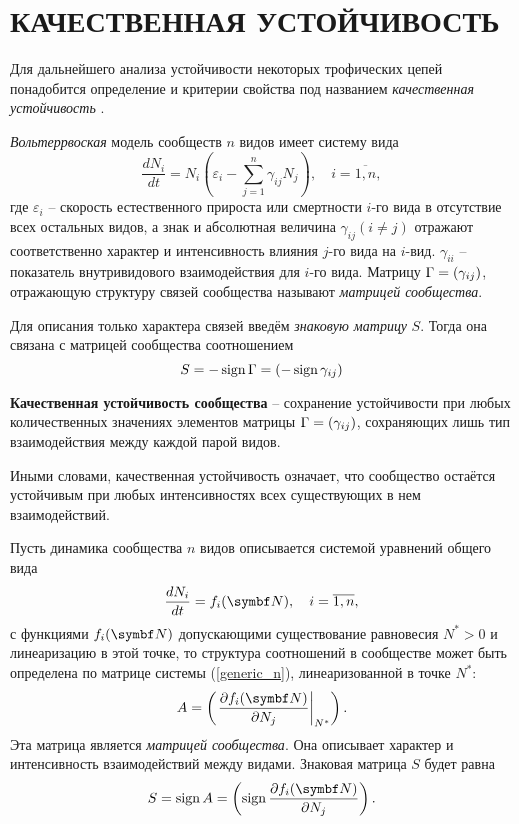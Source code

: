 \section{КАЧЕСТВЕННАЯ УСТОЙЧИВОСТЬ}
    Для дальнейшего анализа устойчивости некоторых трофических цепей понадобится определение и критерии свойства под названием \textit{качественная устойчивость} \cite{svilog}.

    \textit{Вольтеррвоская} модель сообществ \(n\) видов имеет систему вида
    \begin{equation}
        \frac{d N_i}{d t} = N_i \left( \varepsilon_i - \sum_{j=1}^{n} \gamma_{ij} N_j \right), \quad i=\overline{1,n},
    \end{equation}
    где \(\varepsilon_i\) -- скорость естественного прироста или смертности \(i\)-го вида в отсутствие всех остальных видов, а знак и абсолютная величина \(\gamma_{ij} (i \neq j)\) отражают соответственно характер и интенсивность влияния \(j\)-го вида на \(i\)-вид. \(\gamma_{ii}\) -- показатель внутривидового взаимодействия для \(i\)-го вида. Матрицу \(\Gamma = \left(  \gamma_{ij}  \right) \), отражающую структуру связей сообщества называют \textit{матрицей сообщества}.

    Для описания только характера связей введём \textit{знаковую матрицу} \(S\). Тогда она связана с матрицей сообщества соотношением 
    \[
        S = -\operatorname{sign} \Gamma = \left(  - \operatorname{sign} \gamma_{ij}  \right)
    \]

    \begin{definition}
        \textbf{Качественная устойчивость сообщества} -- сохранение устойчивости при любых количественных значениях элементов матрицы \(\Gamma = \left(  \gamma_{ij}  \right)\), сохраняющих лишь тип взаимодействия между каждой парой видов.
    \end{definition}

    Иными словами, качественная устойчивость означает, что сообщество остаётся устойчивым при любых интенсивностях  всех существующих в нем взаимодействий.

    Пусть динамика сообщества \(n\) видов описывается системой уравнений общего вида
    \begin{equation} \label{generic_n}
        \frac{d N_i}{d t} = f_i( \mb{N} ), \quad i = \overline{1,n},
    \end{equation}
    с функциями \(f_i ( \mb{N} )\) допускающими существование равновесия \(N^* > 0\) и линеаризацию в этой точке, то структура соотношений в сообществе может быть определена по матрице системы (\ref{generic_n}), линеаризованной в точке \(N^*\):
    \begin{equation}
        A = \pares{ \left. \frac{\D f_i ( \mb{N} )}{\D N_j} \right|_{N^*} }.
    \end{equation}
    Эта матрица является \textit{матрицей сообщества}. Она описывает характер и интенсивность взаимодействий между видами. Знаковая матрица \(S\) будет равна
    \begin{equation} \label{sign_partial}
        S = \sign A = \pares{ \sign \frac{\D f_i ( \mb{N} )}{\D N_j} }.
    \end{equation}

